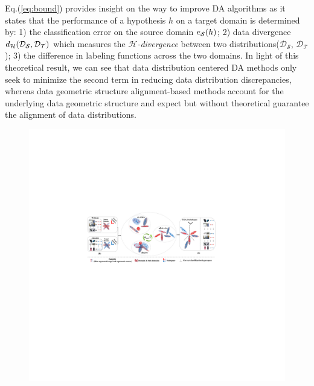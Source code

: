 \documentclass[journal,twocolumn]{IEEEtran}
\begin{document}
\begin{CJK*}{UTF8}{gkai}
	Eq.(\ref{eq:bound})  provides insight on the way to improve DA algorithms as it states that the performance of a hypothesis 
	$h$ on a target domain is determined by: 1) the classification error on the source domain ${e_{\cal S}}(h)$; 2) data divergence ${{d_{\cal H}}({{\cal D}_{\cal S}},{{\cal D}_{\cal T}})}$ which measures the $\mathcal{H}$\emph{-divergence}\cite{kifer2004detecting} between two distributions($\mathcal{D_S}$, $\mathcal{D_T}$); 3) the difference in labeling functions across the two domains. In light of this theoretical result, we can see that  data distribution centered DA methods only seek to minimize the second term in reducing data distribution discrepancies,  whereas data geometric structure alignment-based methods account for the underlying data geometric structure and expect but without theoretical guarantee the alignment of data distributions.  
    
\begin{figure}[h!]
	\centering
	\includegraphics[width=0.98\linewidth]{framework.pdf}


\end{figure}
\end{CJK*}
\end{document}
